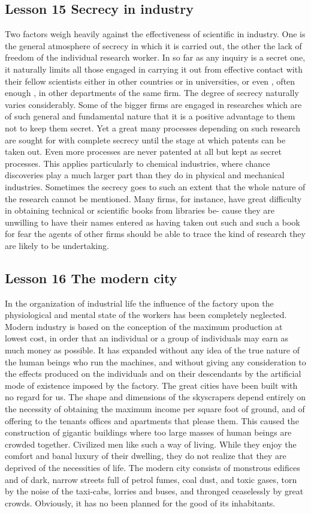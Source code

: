 \documentclass[kindlepaper]{BHCexam4kindle}
\begin{document}
\subsection{Lesson 15
Secrecy in industry}
Two factors weigh heavily against the effectiveness of scientific in industry.
One is the general atmosphere of secrecy in which it is carried out, the
other the lack of freedom of the individual research worker. In so far as any
inquiry is a secret one, it naturally limits all those engaged in carrying it out
from effective contact with their fellow scientists either in other countries or in
universities, or even , often enough , in other departments of the same firm. The
degree of secrecy naturally varies considerably. Some of the bigger firms are engaged
in researches which are of such general and fundamental nature that it is a
positive advantage to them not to keep them secret. Yet a great many processes
depending on such research are sought for with complete secrecy until the stage
at which patents can be taken out. Even more processes are never patented at all
but kept as secret processes. This applies particularly to chemical industries,
where chance discoveries play a much larger part than they do in physical and
mechanical industries. Sometimes the secrecy goes to such an extent that the
whole nature of the research cannot be mentioned. Many firms, for instance,
have great difficulty in obtaining technical or scientific books from libraries be-
cause they are unwilling to have their names entered as having taken out such
and such a book for fear the agents of other firms should be able to trace the kind
of research they are likely to be undertaking.
\clearpage
\subsection{Lesson 16
The modern city}
In the organization of industrial life the influence of the factory upon the physiological and mental state of
the workers has been completely neglected. Modern industry is based on the conception of the maximum
production at lowest cost, in order that an individual or a group of individuals may earn as much money as
possible. It has expanded without any idea of the true nature of the human beings who run the machines, and
without giving any consideration to the effects produced on the individuals and on their descendants by the
artificial mode of existence imposed by the factory. The great cities have been built with no regard for us. The
shape and dimensions of the skyscrapers depend entirely on the necessity of obtaining the maximum income
per square foot of ground, and of offering to the tenants offices and apartments that please them. This caused
the construction of gigantic buildings where too large masses of human beings are crowded together. Civilized
men like such a way of living. While they enjoy the comfort and banal luxury of their dwelling, they do not
realize that they are deprived of the necessities of life. The modern city consists of monstrous edifices and of
dark, narrow streets full of petrol fumes, coal dust, and toxic gases, torn by the noise of the taxi-cabs, lorries
and buses, and thronged ceaselessly by great crowds. Obviously, it has no been planned for the good of its
inhabitants.
\clearpage
\end{document}

